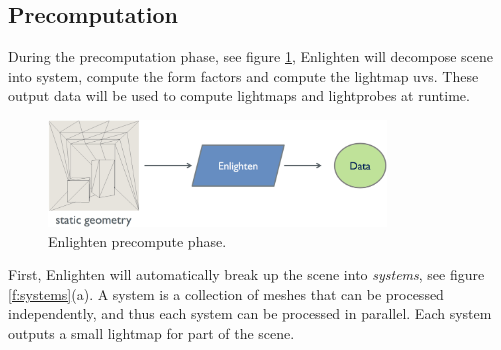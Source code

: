 \subsection{Precomputation}
During the precomputation phase, see figure \ref{f:enlighten-precompute}, Enlighten will decompose scene into system,  compute the form factors and compute the lightmap uvs. These output data will be used to compute lightmaps and lightprobes at runtime.

\begin{figure}\label{f:enlighten-precompute}
	\begin{center}
		\includegraphics[width=0.8\textwidth]{graphics/gi/path-29-1}
	\end{center}
	\caption{Enlighten precompute phase.}
\end{figure}

First, Enlighten will automatically break up the scene into \textit{systems}, see figure \ref{f:systems}(a). A system is a collection of meshes that can be processed independently, and thus each system can be processed in parallel. Each system outputs a small lightmap for part of the scene.

